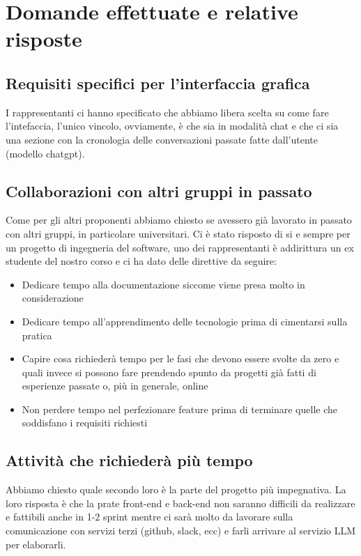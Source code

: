 \documentclass[italian, 12pt]{article}
\begin{document}
\section{Domande effettuate e relative risposte}
\subsection{Requisiti specifici per l'interfaccia grafica}
I rappresentanti ci hanno specificato che abbiamo libera scelta su come fare l'intefaccia, l'unico vincolo, ovviamente, è che sia in modalità chat e che ci sia una sezione con la cronologia delle conversazioni passate fatte dall'utente (modello chatgpt).

\subsection{Collaborazioni con altri gruppi in passato}
Come per gli altri proponenti abbiamo chiesto se avessero già lavorato in passato con altri gruppi, in particolare universitari. Ci è stato risposto di si e sempre per un progetto di ingegneria del software, uno dei rappresentanti è addirittura un ex studente del nostro corso e ci ha dato delle direttive da seguire:
\begin{itemize}
    \item Dedicare tempo alla documentazione siccome viene presa molto in considerazione
    \item Dedicare tempo all'apprendimento delle tecnologie prima di cimentarsi sulla pratica
    \item Capire cosa richiederà tempo per le fasi che devono essere svolte da zero e quali invece si possono fare prendendo spunto da progetti già fatti di esperienze passate o, più in generale, online
    \item Non perdere tempo nel perfezionare feature prima di terminare quelle che soddisfano i requisiti richiesti
\end{itemize}

\subsection{Attività che richiederà più tempo}
Abbiamo chiesto quale secondo loro è la parte del progetto più impegnativa. La loro risposta è che la prate front-end e back-end non saranno difficili da realizzare e fattibili anche in 1-2 sprint mentre ci sarà molto da lavorare sulla comunicazione con servizi terzi (github, slack, ecc) e farli arrivare al servizio LLM per elaborarli.
\end{document}

